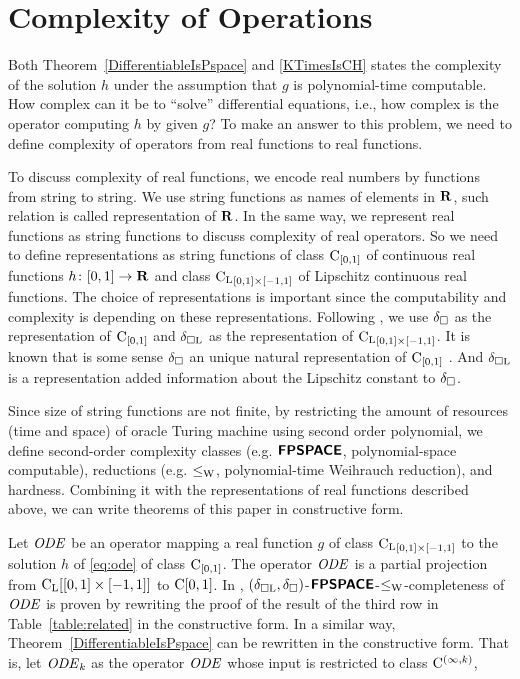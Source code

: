 \section{Complexity of Operations}

Both Theorem~\ref{DifferentiableIsPspace} and \ref{KTimesIsCH}
states the complexity of the solution $h$ under the assumption 
that $g$ is polynomial-time computable.
How complex can it be to ``solve'' differential equations,
i.e., how complex is the operator computing $h$ by given $g$?
To make an answer to this problem,
we need to define complexity of operators from real functions to real functions.

To discuss complexity of real functions,
we encode real numbers by functions from string to string.
We use string functions as names of elements in $\mathbf R$,
such relation is called representation of $\mathbf R$.
In the same way, we represent real functions as string functions
to discuss complexity of real operators.
So we need to define representations as string functions of
class $\mathrm C_{[0, 1]}$ of continuous real functions $h \colon [0,1] \to \mathbf R$ 
and class ${\mathrm C _{\mathrm L}}_{[0, 1] \times [-1, 1]}$ of Lipschitz continuous real functions.
The choice of representations is important since the computability and complexity is depending on these representations.
Following \cite{kawamura2010operators},
we use $\delta _\square$ as the representation of $\mathrm C_{[0,1]}$ and $\delta _{\square \mathrm L}$ as the representation of ${\mathrm C _{\mathrm L}}_{[0, 1] \times [-1, 1]}$.
It is known that is some sense $\delta _\square$ an unique natural representation of $\mathrm C_{[0, 1]}$ \cite{kawamura11:_funct_space_repres_and_polyn_time_comput}.
And $\delta _{\square \mathrm L}$ is a representation
added information about the Lipschitz constant to $\delta _\square$.

Since size of string functions are not finite,
by restricting the amount of resources (time and space) of oracle Turing machine using second order polynomial,
we define second-order complexity classes
(e.g. $\text{\bfseries \sffamily \upshape FPSPACE}$, polynomial-space computable),
reductions (e.g. $\leq _{\mathrm W}$, polynomial-time Weihrauch reduction),
and hardness.
Combining it with the representations of real functions described above,
we can write theorems of this paper in constructive form.

Let $\mathit{ODE}$ be an operator mapping a real function $g$ of class ${\mathrm C _{\mathrm L}}_{[0, 1] \times [-1, 1]}$ to
the solution $h$ of \eqref{eq:ode} of class $\mathrm C_{[0, 1]}$.
The operator $\mathit{ODE}$ is a partial projection from ${\mathrm C _{\mathrm L}} [[0, 1] \times [-1, 1]]$ to $\mathrm C [0, 1]$.
In \cite[Theorem 4.9]{kawamura2010operators},
$(\delta _{\square \mathrm L}, \delta _\square)$-$\text{\bfseries \sffamily \upshape FPSPACE}$-$\leq _{\mathrm W}$-completeness of $\mathit{ODE}$ is proven
by rewriting the proof of the result of the third row in Table~\ref{table:related} in the constructive form.
In a similar way, Theorem~\ref{DifferentiableIsPspace} can be rewritten in the constructive form.
That is, let $\mathit{ODE} _k$ as the operator $\mathit{ODE}$ whose input is restricted to class $\mathrm C^{(\infty, k)}$,

